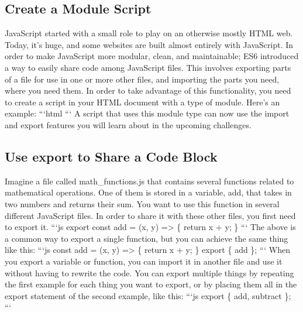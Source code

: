 \documentclass{article}%
\begin{document}
%
\subsection{Create a Module Script}%
\label{subsec:CreateaModuleScript}%
JavaScript started with a small role to play on an otherwise mostly HTML web. Today, it’s huge, and some websites are built almost entirely with JavaScript. In order to make JavaScript more modular, clean, and maintainable; ES6 introduced a way to easily share code among JavaScript files. This involves exporting parts of a file for use in one or more other files, and importing the parts you need, where you need them. In order to take advantage of this functionality, you need to create a script in your HTML document with a type of module. Here’s an example:\newline%
```html\newline%
```\newline%
A script that uses this module type can now use the import and export features you will learn about in the upcoming challenges. \newline%

%
\subsection{Use export to Share a Code Block}%
\label{subsec:UseexporttoShareaCodeBlock}%
Imagine a file called math\_functions.js that contains several functions related to mathematical operations. One of them is stored in a variable, add, that takes in two numbers and returns their sum. You want to use this function in several different JavaScript files. In order to share it with these other files, you first need to export it.\newline%
```js\newline%
export const add = (x, y) => \{\newline%
  return x + y;\newline%
\}\newline%
```\newline%
The above is a common way to export a single function, but you can achieve the same thing like this:\newline%
```js\newline%
const add = (x, y) => \{\newline%
  return x + y;\newline%
\}\newline%
export \{ add \};\newline%
```\newline%
When you export a variable or function, you can import it in another file and use it without having to rewrite the code. You can export multiple things by repeating the first example for each thing you want to export, or by placing them all in the export statement of the second example, like this:\newline%
```js\newline%
export \{ add, subtract \};\newline%
```\newline%
\end{document}
